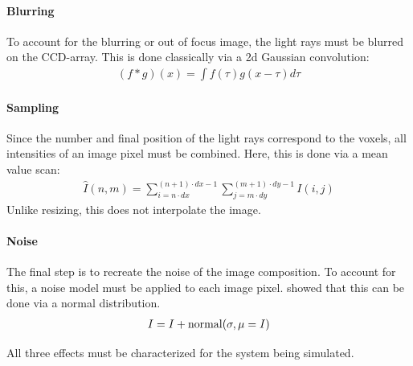 \paragraph{Blurring}
To account for the blurring or out of focus image, the light rays must be blurred on the \ac{CCD}-array.
This is done classically via a 2d Gaussian convolution:
\begin{align}
    (f * g)(x) = \int f(\tau)g(x-\tau)d\tau
\end{align}
%
\paragraph{Sampling}
Since the number and final position of the light rays correspond to the voxels, all intensities of an image pixel must be combined.
Here, this is done via a mean value scan:
\begin{align}
    \hat{I}(n,m) = \sum_{i=n \cdot dx}^{(n+1) \cdot dx-1}\sum_{j=m \cdot dy}^{(m+1) \cdot dy-1} I(i,j)
\end{align}
Unlike resizing, this does not interpolate the image.
%
\paragraph{Noise}
The final step is to recreate the noise of the image composition.
To account for this, a noise model must be applied to each image pixel.
\cite{Wiese:887678} showed that this can be done via a normal distribution.
%
\begin{align}
    I = I + \operatorname{normal}(\sigma, \mu=I)
\end{align}
%
\par
%
All three effects must be characterized for the system being simulated.
%
%
%

